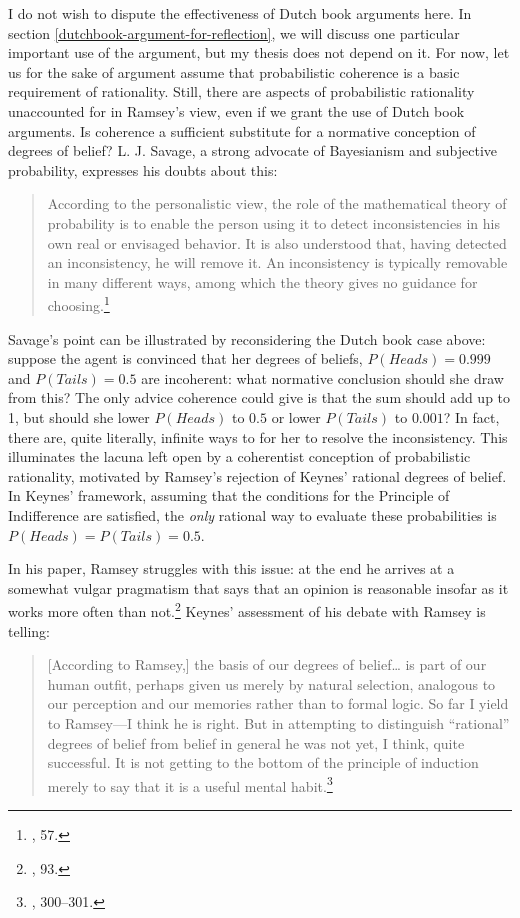I do not wish to dispute the effectiveness of Dutch book arguments here. In section \ref{dutchbook-argument-for-reflection}, we will discuss one particular important use of the argument, but my thesis does not depend on it.
For now, let us for the sake of argument assume that probabilistic coherence is a
basic requirement of rationality. Still, there are aspects of probabilistic rationality  unaccounted for in Ramsey's view, even
if we grant the use of Dutch book arguments. Is coherence a
sufficient substitute for a normative conception of degrees of belief?
L. J. Savage, a strong advocate of Bayesianism and subjective
probability, expresses his doubts about this:

\begin{quote}
According to the personalistic view, the role of the mathematical theory
of probability is to enable the person using it to detect
inconsistencies in his own real or envisaged behavior. It is also
understood that, having detected an inconsistency, he will remove it. An
inconsistency is typically removable in many different ways, among which
the theory gives no guidance for choosing.\footnote{\cite{savage}, 57.}
\end{quote}

Savage's point can be illustrated by reconsidering the Dutch book case
above: suppose the agent is convinced that her degrees of beliefs,
\(P(Heads) = 0.999\) and \(P(Tails) = 0.5\) are incoherent: what
normative conclusion should she draw from this? The only advice coherence
could give is that the sum should add up to 1, but should she lower
\(P(Heads)\) to \(0.5\) or lower \(P(Tails)\) to \(0.001\)? In fact,
there are, quite literally, infinite ways to for her to resolve the
inconsistency. This illuminates the lacuna left open by a coherentist conception of probabilistic rationality, motivated by Ramsey's rejection of Keynes' rational degrees
of belief. In Keynes' framework, assuming that the conditions for the
Principle of Indifference are satisfied, the \emph{only} rational way to
evaluate these probabilities is \(P(Heads) = P(Tails) = 0.5\).

In his paper, Ramsey struggles with this issue: at the end he arrives at
a somewhat vulgar pragmatism that says that an opinion is reasonable
insofar as it works more often than not.\footnote{\cite{ramsey}, 93.} 
Keynes' assessment of his debate
with Ramsey is telling:

\begin{quote}
{[}According to Ramsey,{]} the basis of our degrees of belief\ldots{} is
part of our human outfit, perhaps given us merely by natural selection,
analogous to our perception and our memories rather than to formal
logic. So far I yield to Ramsey---I think he is right. But in attempting
to distinguish ``rational'' degrees of belief from belief in general he
was not yet, I think, quite successful. It is not getting to the bottom
of the principle of induction merely to say that it is a useful mental
habit.\footnote{\cite{keynesbio}, 300--301.}
\end{quote}

